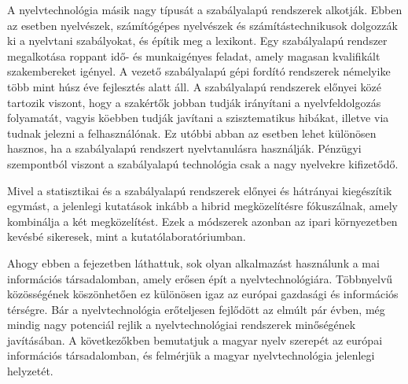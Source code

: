 \begin{multicols}{2}
  A nyelvtechnológia másik nagy típusát a szabályalapú rendszerek alkotják. Ebben az esetben nyelvészek, számítógépes nyel\-vé\-szek és számítástechnikusok dolgozzák ki a nyelvtani szabályokat, és építik meg a lexikont. Egy szabályalapú rendszer megalkotása roppant idő- és munkaigényes feladat, amely magasan kvalifikált szak\-em\-be\-re\-ket igényel. A vezető szabályalapú gépi fordító rendszerek némelyike több mint húsz éve fejlesztés alatt áll. A szabályalapú rendszerek előnyei közé tartozik viszont, hogy a szakértők jobban tudják irányítani a nyelvfeldolgozás fo\-lya\-ma\-tát, va\-gyis köebben tudják javítani a szisztematikus hibákat, illetve via tudnak jelezni a felhasználónak. Ez utóbbi abban az esetben lehet különösen hasznos, ha a sza\-bály\-ala\-pú rendszert nyelvtanulásra használják. Pénzügyi szempontból viszont a sza\-bály\-ala\-pú technológia csak a nagy nyelvekre kifizetődő.

  Mivel a statisztikai és a szabályalapú rendszerek előnyei és hátrányai kiegészítik egymást, a jelenlegi kutatások inkább a hibrid megközelítésre fókuszálnak, amely kombinálja a két megközelítést. Ezek a módszerek azonban az ipari környezetben kevésbé sikeresek, mint a kutatólaboratóriumban. 

  Ahogy ebben a fejezetben láthattuk, sok olyan alkalmazást használunk a mai információs társadalomban, amely erősen épít a nyelvtechnológiára. Többnyelvű közösségének köszönhetően ez különösen igaz az európai gazdasági és információs térségre. Bár a nyelvtechnológia erőteljesen fejlődött az elmúlt pár évben, még mindig nagy potenciál rejlik a nyelvtechnológiai rendszerek minőségének ja\-ví\-tá\-sá\-ban. A következőkben bemutatjuk a magyar nyelv szerepét az európai információs társadalomban, és felmérjük a magyar nyelvtechnológia jelenlegi helyzetét.
  \end{multicols}

  \clearpage



